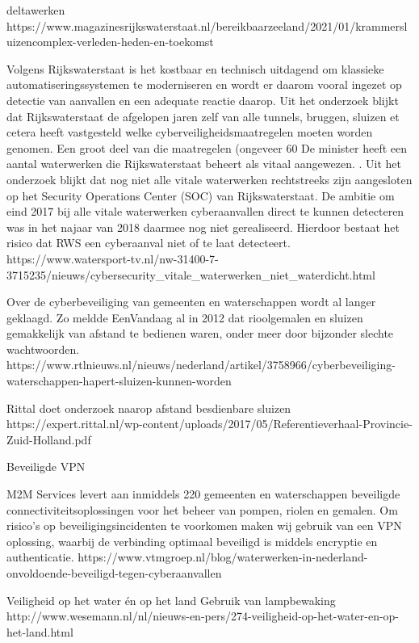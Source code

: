 deltawerken
https://www.magazinesrijkswaterstaat.nl/bereikbaarzeeland/2021/01/krammersluizencomplex-verleden-heden-en-toekomst


Volgens Rijkswaterstaat is het kostbaar en technisch uitdagend om klassieke automatiseringssystemen te moderniseren en wordt er daarom vooral ingezet op detectie van aanvallen en een adequate reactie daarop.
Uit het onderzoek blijkt dat Rijkswaterstaat de afgelopen jaren zelf van alle tunnels, bruggen, sluizen et cetera heeft vastgesteld welke cyberveiligheidsmaatregelen moeten worden genomen. Een groot deel van die maatregelen (ongeveer 60%
De minister heeft een aantal waterwerken die Rijkswaterstaat beheert als vitaal aangewezen. . Uit het onderzoek blijkt dat nog niet alle vitale waterwerken rechtstreeks zijn aangesloten op het Security Operations Center (SOC) van Rijkswaterstaat. De ambitie om eind 2017 bij alle vitale waterwerken cyberaanvallen direct te kunnen detecteren was in het najaar van 2018 daarmee nog niet gerealiseerd. Hierdoor bestaat het risico dat RWS een cyberaanval niet of te laat detecteert.
https://www.watersport-tv.nl/nw-31400-7-3715235/nieuws/cybersecurity_vitale_waterwerken_niet_waterdicht.html


Over de cyberbeveiliging van gemeenten en waterschappen wordt al langer geklaagd. Zo meldde EenVandaag al in 2012 dat rioolgemalen en sluizen gemakkelijk van afstand te bedienen waren, onder meer door bijzonder slechte wachtwoorden.
https://www.rtlnieuws.nl/nieuws/nederland/artikel/3758966/cyberbeveiliging-waterschappen-hapert-sluizen-kunnen-worden

Rittal doet onderzoek naarop afstand besdienbare sluizen
https://expert.rittal.nl/wp-content/uploads/2017/05/Referentieverhaal-Provincie-Zuid-Holland.pdf



Beveiligde VPN

M2M Services levert aan inmiddels 220 gemeenten en waterschappen beveiligde connectiviteitsoplossingen voor het beheer van pompen, riolen en gemalen. Om risico’s op beveiligingsincidenten te voorkomen maken wij gebruik van een VPN oplossing, waarbij de verbinding optimaal beveiligd is middels encryptie en authenticatie.
https://www.vtmgroep.nl/blog/waterwerken-in-nederland-onvoldoende-beveiligd-tegen-cyberaanvallen

Veiligheid op het water én op het land
Gebruik van lampbewaking 
http://www.wesemann.nl/nl/nieuws-en-pers/274-veiligheid-op-het-water-en-op-het-land.html





